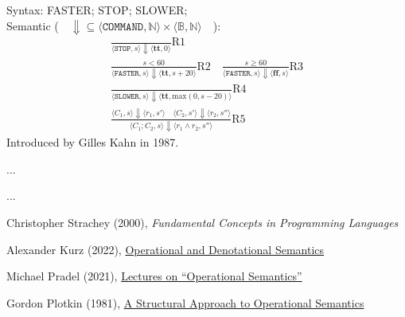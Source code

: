 \documentclass{article}
\begin{document}
Syntax: {\ttfamily FASTER; STOP; SLOWER;}\\
Semantic ($\quad\bm{\Downarrow} \subseteq \langle \texttt{COMMAND}, \mathbb{N} \rangle \times \langle \mathbb{B}, \mathbb{N} \rangle\quad$):
\begin{gather*}
\frac
  {}
  {\langle \texttt{STOP}, s \rangle \Downarrow \langle \textbf{tt}, 0 \rangle }
  \text{R1}
\\[12pt]
\frac
  { s < 60 }
  {\langle \texttt{FASTER}, s \rangle \Downarrow \langle \textbf{tt}, s + 20 \rangle }
  \text{R2}
\quad
\frac
  { s \geq 60 }
  {\langle \texttt{FASTER}, s \rangle \Downarrow \langle \textbf{ff}, s \rangle }
  \text{R3}
\\[12pt]
\frac
  {}
  {\langle \texttt{SLOWER}, s \rangle \Downarrow \langle \textbf{tt}, \text{max}(0, s - 20) \rangle }
  \text{R4}
\\[12pt]
\frac
  {\langle C_1, s \rangle \Downarrow \langle r_1, s' \rangle \quad \langle C_2, s' \rangle \Downarrow \langle r_2, s'' \rangle }
  {\langle C_1 ; C_2, s \rangle \Downarrow \langle r_1 \wedge r_2, s'' \rangle }
  \text{R5}
\end{gather*}
Introduced by Gilles Kahn in 1987.
\plush{}


\begin{prooftree}
\end{prooftree}
\plush{}


...
\plush{}


...
\plush{}


Christopher Strachey (2000),
\emph{Fundamental Concepts in Programming Languages}

Alexander Kurz (2022),
\href{https://hackmd.io/@alexhkurz/Hkf6BTL6P}{Operational and Denotational Semantics}

Michael Pradel (2021),
\href{https://www.youtube.com/watch?v=jsBHd3-04oA}{Lectures on ``Operational Semantics''}

Gordon Plotkin (1981),
\href{https://web.eecs.umich.edu/~weimerw/2006-615/reading/plotkin81structural.pdf}{A Structural Approach to Operational Semantics}
\end{document}
